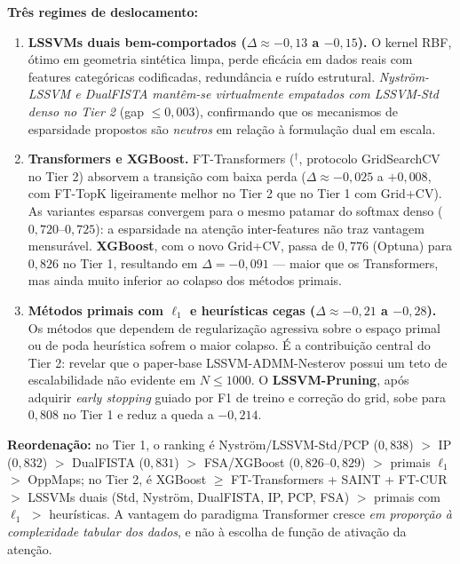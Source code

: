 \documentclass[12pt,a4paper]{article}
\begin{document}
\textbf{Três regimes de deslocamento:}
\begin{enumerate}
  \item \textbf{LSSVMs duais bem-comportados ($\Delta \approx -0{,}13$ a $-0{,}15$).}
        O kernel RBF, ótimo em geometria sintética limpa, perde eficácia em
        dados reais com features categóricas codificadas, redundância e ruído
        estrutural. \emph{Nyström-LSSVM e DualFISTA mantêm-se virtualmente
        empatados com LSSVM-Std denso no Tier 2} (gap $\leq 0{,}003$),
        confirmando que os mecanismos de esparsidade propostos são
        \emph{neutros} em relação à formulação dual em escala.
  \item \textbf{Transformers e XGBoost.} FT-Transformers ($^\dagger$,
        protocolo GridSearchCV no Tier 2) absorvem a transição com baixa perda
        ($\Delta \approx -0{,}025$ a $+0{,}008$, com FT-TopK ligeiramente
        melhor no Tier 2 que no Tier 1 com Grid+CV). As variantes esparsas
        convergem para o mesmo patamar do softmax denso ($0{,}720$--$0{,}725$):
        a esparsidade na atenção inter-features não traz vantagem mensurável.
        \textbf{XGBoost}, com o novo Grid+CV, passa de $0{,}776$ (Optuna) para
        $0{,}826$ no Tier 1, resultando em $\Delta = -0{,}091$ --- maior que
        os Transformers, mas ainda muito inferior ao colapso dos métodos primais.
  \item \textbf{Métodos primais com $\ell_1$ e heurísticas cegas
        ($\Delta \approx -0{,}21$ a $-0{,}28$).} Os métodos que dependem
        de regularização agressiva sobre o espaço primal ou de poda
        heurística sofrem o maior colapso. É a contribuição central do
        Tier 2: revelar que o paper-base LSSVM-ADMM-Nesterov possui um
        teto de escalabilidade não evidente em $N \leq 1000$. O
        \textbf{LSSVM-Pruning}, após adquirir \emph{early stopping}
        guiado por F1 de treino e correção do grid, sobe para $0{,}808$ no
        Tier 1 e reduz a queda a $-0{,}214$.
\end{enumerate}

\textbf{Reordenação:} no Tier 1, o ranking é Nyström/LSSVM-Std/PCP ($0{,}838$)
$>$ IP ($0{,}832$) $>$ DualFISTA ($0{,}831$) $>$ FSA/XGBoost ($0{,}826$--$0{,}829$)
$>$ primais $\ell_1$ $>$ OppMaps; no Tier 2, é XGBoost $\geq$
FT-Transformers + SAINT + FT-CUR $>$ LSSVMs duais (Std, Nyström, DualFISTA,
IP, PCP, FSA) $>$ primais com $\ell_1$ $>$ heurísticas. A vantagem do
paradigma Transformer cresce \emph{em proporção à complexidade tabular dos
dados}, e não à escolha de função de ativação da atenção.
\end{document}
